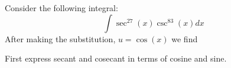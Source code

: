 \documentclass{ximera}
\author{Bart Snapp}
\begin{document}
\begin{exercise}
Consider the following integral:
  \[
  \int \sec^{27}(x)\csc^{83}(x) dx
  \]
  After making the substitution, $u = \cos(x)$ we find
  \begin{hint}
    First express secant and cosecant in terms of cosine and sine.
  \end{hint}\begin{multipleChoice}
  \end{multipleChoice}
\end{exercise}
\end{document}
